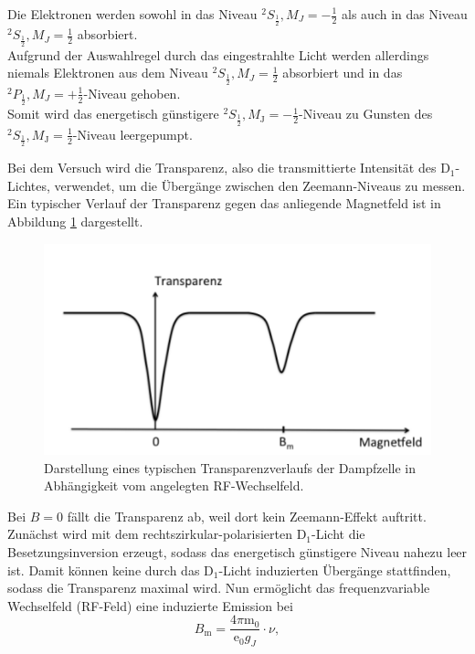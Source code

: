 Die Elektronen werden sowohl in das Niveau $^2S_{\frac{1}{2}}, M_J = -\frac{1}{2}$ als auch in das Niveau $^2S_{\frac{1}{2}}, M_J = \frac{1}{2}$ absorbiert.\\
Aufgrund der Auswahlregel durch das eingestrahlte Licht werden allerdings niemals Elektronen aus dem Niveau $^2S_{\frac{1}{2}}, M_J = \frac{1}{2}$ absorbiert und in das $^2P_{\frac{1}{2}}, M_J = +\frac{1}{2}$-Niveau gehoben.\\
Somit wird das energetisch günstigere $^2S_{\frac{1}{2}}, M_{\mathrm{J}} = -\frac{1}{2}$-Niveau zu Gunsten des $^2S_{\frac{1}{2}}, M_{\mathrm{J}} = \frac{1}{2}$-Niveau leergepumpt.

Bei dem Versuch wird die Transparenz, also die transmittierte Intensität
des D$_1$-Lichtes, verwendet, um die Übergänge zwischen den Zeemann-Niveaus
zu messen.
Ein typischer Verlauf der Transparenz gegen das anliegende Magnetfeld
ist in Abbildung \ref{fig:transparenz} dargestellt.
\begin{figure}
  \centering
  \includegraphics[width=0.9\columnwidth]{pictures/transparenz.png}
  \caption{Darstellung eines typischen Transparenzverlaufs der Dampfzelle in Abhängigkeit vom angelegten RF-Wechselfeld. \cite{Anleitung}}
  \label{fig:transparenz}
\end{figure}
Bei $B=0$ fällt die Transparenz ab, weil dort
kein Zeemann-Effekt auftritt.
Zunächst wird mit dem rechtszirkular-polarisierten D$_1$-Licht die Besetzungsinversion erzeugt, sodass
das energetisch günstigere Niveau nahezu leer ist. Damit können keine
durch das D$_1$-Licht induzierten Übergänge stattfinden, sodass die
Transparenz maximal wird. Nun ermöglicht das frequenzvariable
Wechselfeld (RF-Feld) eine induzierte Emission bei
\begin{equation}
	\label{eqn:g_f}
	B_{\mathrm{m}} = \frac{4\pi \mathrm{m}_0}{\mathrm{e}_0 g_J}\cdot \nu \mathrm{,}
\end{equation}

